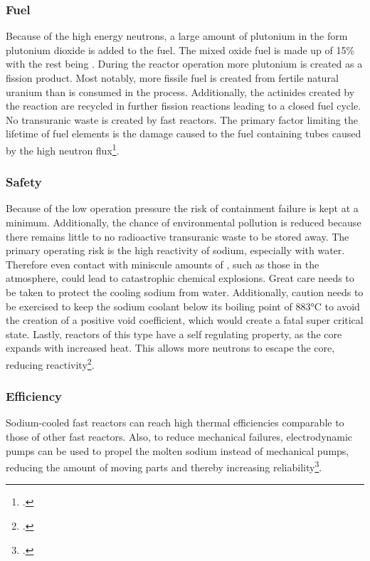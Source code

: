 \subsubsection{Fuel}
Because of the high energy neutrons, a large amount of plutonium in the form
plutonium dioxide  is added to the fuel. The mixed oxide fuel is made up of 15\% 
with the rest being . During the reactor operation more plutonium is created as a fission product.
Most notably, more fissile fuel is created from fertile natural uranium than is consumed in the process.
Additionally, the actinides created by the reaction are recycled in further fission reactions leading
to a closed fuel cycle. No transuranic waste is created by fast reactors. The primary
factor limiting the lifetime of fuel elements is the damage caused to the fuel containing tubes
caused by the high neutron flux\footcite[111]{T4Gen}.
\subsubsection{Safety}
Because of the low operation pressure the risk of containment failure is kept at a minimum. Additionally,
the chance of environmental pollution is reduced because there remains little to no radioactive transuranic
waste to be stored away. The primary operating risk is the high reactivity of sodium, especially with water.
Therefore even contact with miniscule amounts of , such as those in the atmosphere, could
lead to catastrophic chemical explosions. Great care needs to be taken to protect the cooling
sodium from water. Additionally, caution needs to be exercised to keep the sodium coolant
below its boiling point of 883°C to avoid the creation of a positive void coefficient, which
would create a fatal super critical state. Lastly, reactors of this type have a self regulating
property, as the core expands with increased heat. This allows more neutrons to escape the
core, reducing reactivity\footcite[30-37]{GIFAR}.
\subsubsection{Efficiency}
Sodium-cooled fast reactors can reach high thermal efficiencies comparable to those of other fast
reactors. Also, to reduce mechanical failures, electrodynamic pumps can be used to propel the
molten sodium instead of mechanical pumps, reducing the amount of moving parts and thereby increasing
reliability\footcite[30-37]{GIFAR}. 
\pagebreak
